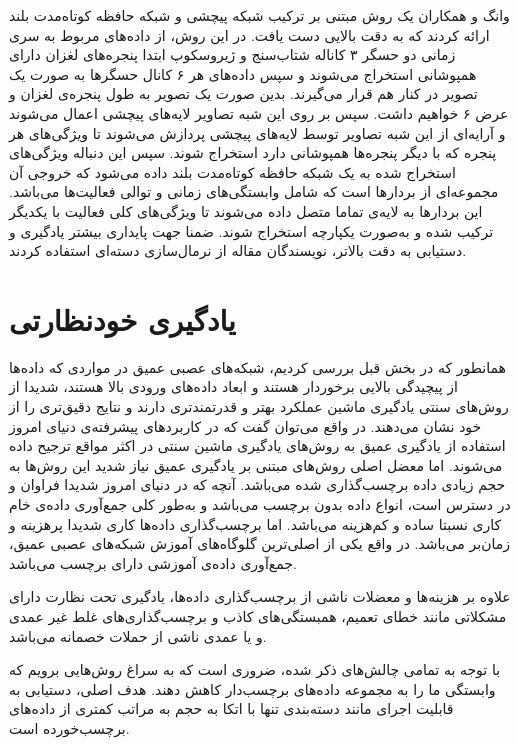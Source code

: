 وانگ و همکاران\cite{wang2020wearable} یک روش مبتنی بر ترکیب شبکه پیچشی و شبکه حافظه کوتاه‌مدت بلند ارائه کردند که به دقت بالایی دست یافت. در این روش، از داده‌های مربوط به سری زمانی دو حسگر ۳ کاناله شتاب‌سنج و ژیروسکوپ ابتدا
پنجره‌های لغزان
دارای همپوشانی استخراج می‌شوند و سپس داده‌های هر ۶ کانال حسگرها به صورت یک تصویر در کنار هم قرار می‌گیرند. بدین صورت یک تصویر به طول پنجره‌ی لغزان و عرض ۶ خواهیم داشت. سپس بر روی این شبه تصاویر لایه‌های پیچشی اعمال می‌شوند و آرایه‌ای از این شبه تصاویر توسط لایه‌های پیچشی پردازش می‌شوند تا ویژگی‌های هر پنجره که با دیگر پنجره‌ها همپوشانی دارد استخراج شوند. سپس این دنباله ویژگی‌های استخراج شده به یک شبکه حافظه کوتاه‌مدت بلند داده می‌شود که خروجی آن مجموعه‌ای از بردارها است که شامل وابستگی‌های زمانی و توالی فعالیت‌ها می‌باشد. این بردارها به لایه‌ی تماما متصل داده می‌شوند تا ویژگی‌های کلی فعالیت با یکدیگر
ترکیب
شده و به‌صورت یکپارچه استخراج شوند. ضمنا جهت پایداری بیشتر یادگیری و دستیابی به دقت بالاتر، نویسندگان مقاله از
نرمال‌سازی دسته‌ای
استفاده کردند.

\section{یادگیری خودنظارتی}

همانطور که در بخش قبل بررسی کردیم، شبکه‌های عصبی عمیق در مواردی که داده‌ها از پیچیدگی بالایی برخوردار هستند و ابعاد داده‌های ورودی بالا هستند، شدیدا از روش‌های سنتی یادگیری ماشین عملکرد بهتر و قدرتمندتری دارند و نتایج دقیق‌تری را از خود نشان می‌دهند. در واقع می‌توان گفت که در کاربردهای پیشرفته‌ی دنیای امروز استفاده از یادگیری عمیق به روش‌های یادگیری ماشین سنتی در اکثر مواقع ترجیح داده می‌شوند. اما معضل اصلی روش‌های مبتنی بر یادگیری عمیق نیاز شدید این روش‌ها به حجم زیادی داده برچسب‌گذاری شده می‌باشد. آنچه که در دنیای امروز شدیدا فراوان و در دسترس است، انواع داده بدون برچسب می‌باشد و به‌طور کلی جمع‌آوری داده‌ی خام کاری نسبتا ساده و کم‌هزینه می‌باشد. اما برچسب‌گذاری داده‌ها کاری شدیدا پرهزینه و زمان‌بر می‌باشد. در واقع یکی از اصلی‌ترین
گلوگاه‌های
آموزش شبکه‌های عصبی عمیق، جمع‌آوری داده‌ی آموزشی دارای برچسب می‌باشد.

علاوه بر هزینه‌ها و معضلات ناشی از برچسب‌گذاری داده‌ها، یادگیری تحت نظارت دارای مشکلاتی مانند 
خطای تعمیم،
همبستگی‌های کاذب
و برچسب‌گذاری‌های غلط غیر عمدی و یا عمدی ناشی از حملات خصمانه
می‌باشد\cite{liu2021self}.

با توجه به تمامی چالش‌های ذکر شده، ضروری است که به سراغ روش‌هایی برویم که وابستگی ما را به مجموعه داده‌های برچسب‌دار کاهش دهند. هدف اصلی، دستیابی به قابلیت اجرای مانند دسته‌بندی تنها با اتکا به حجم به مراتب کمتری از داده‌های برچسب‌خورده است.

